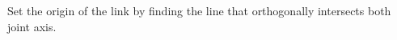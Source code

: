 \documentclass[preview]{standalone}
\begin{document}
\begin{center}
Set the origin of the link by finding the line that orthogonally intersects both joint axis.
\end{center}
\end{document}
